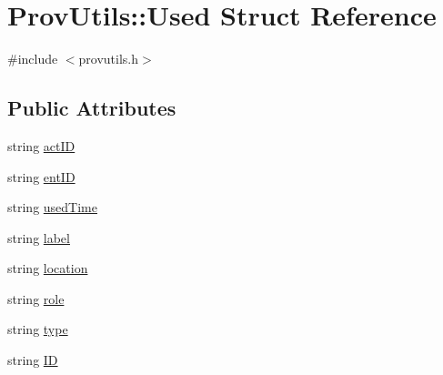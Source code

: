 \hypertarget{struct_prov_utils_1_1_used}{\section{Prov\-Utils\-:\-:Used Struct Reference}
\label{struct_prov_utils_1_1_used}
}


{\ttfamily \#include $<$provutils.\-h$>$}

\subsection*{Public Attributes}
\begin{DoxyCompactItemize}
\item 
string \hyperlink{struct_prov_utils_1_1_used_ae9754f73fcf3c6ecff1c0aa3e8362079}{act\-I\-D}
\item 
string \hyperlink{struct_prov_utils_1_1_used_ac53b2a074e71f7b481245eeda9fd0ecb}{ent\-I\-D}
\item 
string \hyperlink{struct_prov_utils_1_1_used_a1df6793b3f8578bcd10d4656686076a1}{used\-Time}
\item 
string \hyperlink{struct_prov_utils_1_1_used_a32a7fe21697b5cd4e9d5a4f70875a1e7}{label}
\item 
string \hyperlink{struct_prov_utils_1_1_used_ad10b41ea4d8293a2bc74757ed6242d8d}{location}
\item 
string \hyperlink{struct_prov_utils_1_1_used_a3f01967a2959a16d281ef6670436020a}{role}
\item 
string \hyperlink{struct_prov_utils_1_1_used_aad9ebc316314b07ee9f6a28467de6948}{type}
\item 
string \hyperlink{struct_prov_utils_1_1_used_aed0e9fdd3f44f6711c33765e9526c06b}{I\-D}
\end{DoxyCompactItemize}


